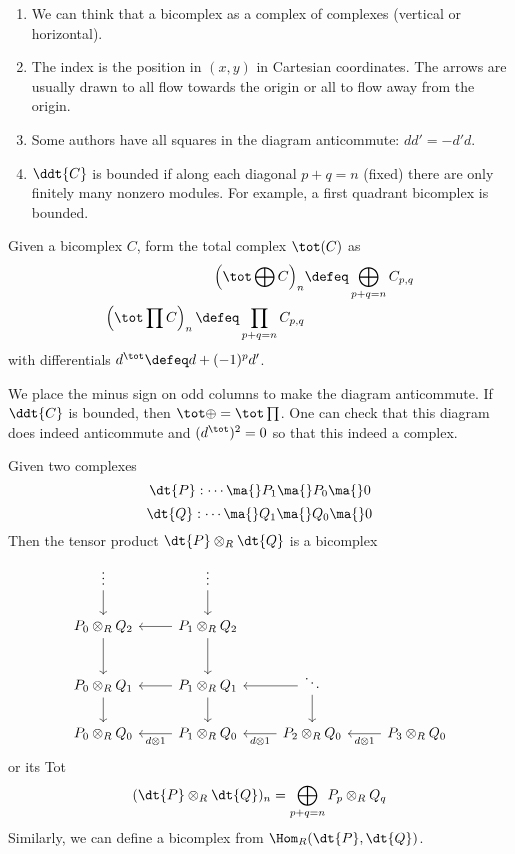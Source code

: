 \begin{enumerate}[1.]
\item We can think that a bicomplex as a complex of complexes (vertical or horizontal). 
\item The index is the position in $(x,y)$ in Cartesian coordinates. The arrows are usually drawn to all flow towards the origin or all to flow away from the origin. 
\item Some authors have all squares in the diagram anticommute: $dd'= - d'd$. 
\item $\ddt{C}$ is bounded if along each diagonal $p+q=n$ (fixed) there are only finitely many nonzero modules. For example, a first quadrant bicomplex is bounded. 
\end{enumerate}

\begin{dfn}
Given a bicomplex $C$, form the total complex $\tot(C)$ as
\[
\begin{split}
\left( \tot \bigoplus C \right)_n &\defeq \bigoplus_{p+q=n} C_{p,q} \\
\left( \tot \prod C \right)_n \defeq \prod_{p+q=n} C_{p,q}
\end{split}
\]
with differentials $d^{\tot} \defeq d+(-1)^pd'$. 
\end{dfn}

\begin{rem}
We place the minus sign on odd columns to make the diagram anticommute. If $\ddt{C}$ is bounded, then $\tot \oplus= \tot \prod$. One can check that this diagram does indeed anticommute and $(d^{\tot})^2=0$ so that this indeed a complex. 
\end{rem}

\begin{ex}
Given two complexes
\[
\dt{P}: \cdots \ma{} P_1 \ma{} P_0 \ma{} 0 
\]
\[
\dt{Q}: \cdots \ma{} Q_1 \ma{} Q_0 \ma{} 0
\]
Then the tensor product $\dt{P} \otimes_R \dt{Q}$ is a bicomplex
\[
\begin{tikzcd}
\vdots \arrow{d} & \vdots \arrow{d} & & \\
P_0 \otimes_R Q_2 \arrow{d} & P_1 \otimes_R Q_2 \arrow{d} \arrow{l} & & \\
P_0 \otimes_R Q_1 \arrow{d} & P_1 \otimes_R Q_1 \arrow{d} \arrow{l} & \ddots \arrow{l} \arrow{d} & \\
P_0 \otimes_R Q_0  & P_1 \otimes_R Q_0 \arrow{l}{d \otimes 1} & P_2 \otimes_R Q_0  \arrow{l}{d \otimes 1} & P_3 \otimes_R Q_0 \arrow{l}{d \otimes 1} 
\end{tikzcd}
\]
or its Tot
\[
(\dt{P} \otimes_R \dt{Q})_n = \bigoplus_{p+q=n} P_p \otimes_R Q_q
\]
Similarly, we can define a bicomplex from $\Hom_R(\dt{P},\dt{Q})$.
\end{ex}

